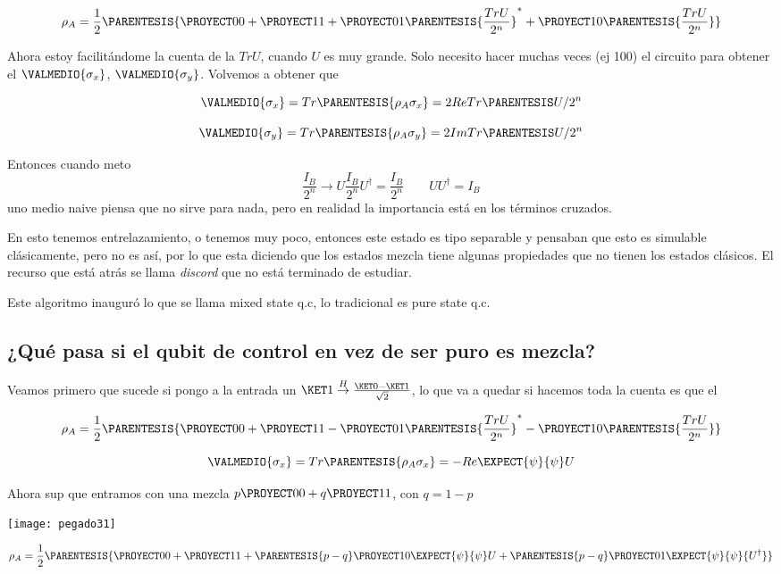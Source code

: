 \[
\rho_{A}=\frac{1}{2}\PARENTESIS{\PROYECT 00+\PROYECT 11+\PROYECT 01\PARENTESIS{\frac{TrU}{2^{n}}}^{*}+\PROYECT 10\PARENTESIS{\frac{TrU}{2^{n}}}}
\]

Ahora estoy facilitándome la cuenta de la $TrU$, cuando $U$ es muy
grande. Solo necesito hacer muchas veces (ej 100) el circuito para
obtener el $\VALMEDIO{\sigma_{x}}$, $\VALMEDIO{\sigma_{y}}$. Volvemos
a obtener que 

\[
\VALMEDIO{\sigma_{x}}=Tr\PARENTESIS{\rho_{A}\sigma_{x}}=2ReTr\PARENTESIS U/2^{n}
\]

\[
\VALMEDIO{\sigma_{y}}=Tr\PARENTESIS{\rho_{A}\sigma_{y}}=2ImTr\PARENTESIS U/2^{n}
\]

Entonces cuando meto 
\[
\frac{I_{B}}{2^{n}}\rightarrow U\frac{I_{B}}{2^{n}}U^{\dagger}=\frac{I_{B}}{2^{n}}\qquad UU^{\dagger}=I_{B}
\]
uno medio naive piensa que no sirve para nada, pero en realidad la
importancia está en los términos cruzados. 

En esto tenemos entrelazamiento, o tenemos muy poco, entonces este
estado es tipo separable y pensaban que esto es simulable clásicamente,
pero no es así, por lo que esta diciendo que los estados mezcla tiene
algunas propiedades que no tienen los estados clásicos. El recurso
que está atrás se llama \emph{discord} que no está terminado de estudiar. 

Este algoritmo inauguró lo que se llama mixed state q.c, lo tradicional
es pure state q.c.

\subsection{¿Qué pasa si el qubit de control en vez de ser puro es mezcla?}

Veamos primero que sucede si pongo a la entrada un $\KET 1\overset{H}{\rightarrow}\frac{\KET 0-\KET 1}{\sqrt{2}}$,
lo que va a quedar si hacemos toda la cuenta es que el

\[
\rho_{A}=\frac{1}{2}\PARENTESIS{\PROYECT 00+\PROYECT 11-\PROYECT 01\PARENTESIS{\frac{TrU}{2^{n}}}^{*}-\PROYECT 10\PARENTESIS{\frac{TrU}{2^{n}}}}
\]

\[
\VALMEDIO{\sigma_{x}}=Tr\PARENTESIS{\rho_{A}\sigma_{x}}=-Re\EXPECT{\psi}{\psi}U
\]

Ahora sup que entramos con una mezcla $p\PROYECT 00+q\PROYECT 11$,
con $q=1-p$

\texttt{[image: pegado31]}

\[
\rho_{A}=\frac{1}{2}\PARENTESIS{\PROYECT 00+\PROYECT 11+\PARENTESIS{p-q}\PROYECT 10\EXPECT{\psi}{\psi}U+\PARENTESIS{p-q}\PROYECT 01\EXPECT{\psi}{\psi}{U^{\dagger}}}
\]

